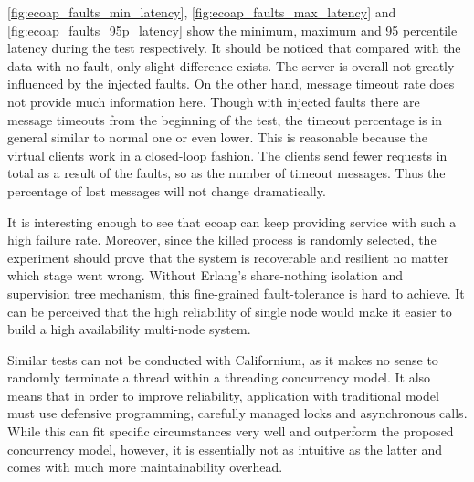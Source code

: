\autoref{fig:ecoap_faults_min_latency}, \autoref{fig:ecoap_faults_max_latency} and \autoref{fig:ecoap_faults_95p_latency} show the minimum, maximum and 95 percentile latency during the test respectively. It should be noticed that compared with the data with no fault, only slight difference exists. The server is overall not greatly influenced by the injected faults. On the other hand, message timeout rate does not provide much information here. Though with injected faults there are message timeouts from the beginning of the test, the timeout percentage is in general similar to normal one or even lower. This is reasonable because the virtual clients work in a closed-loop fashion. The clients send fewer requests in total as a result of the faults, so as the number of timeout messages. Thus the percentage of lost messages will not change dramatically.

It is interesting enough to see that ecoap can keep providing service with such a high failure rate. Moreover, since the killed process is randomly selected, the experiment should prove that the system is recoverable and resilient no matter which stage went wrong. Without Erlang's share-nothing isolation and supervision tree mechanism, this fine-grained fault-tolerance is hard to achieve. It can be perceived that the high reliability of single node would make it easier to build a high availability multi-node system.

Similar tests can not be conducted with Californium, as it makes no sense to randomly terminate a thread within a threading concurrency model. It also means that in order to improve reliability, application with traditional model must use defensive programming, carefully managed locks and asynchronous calls. While this can fit specific circumstances very well and outperform the proposed concurrency model, however, it is essentially not as intuitive as the latter and comes with much more maintainability overhead. 




